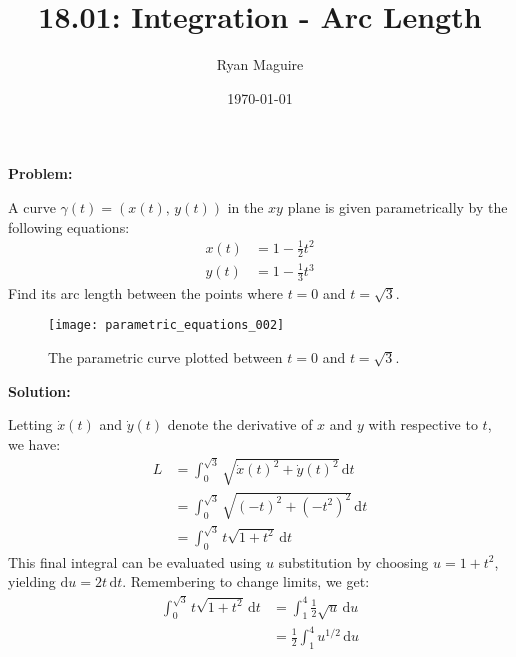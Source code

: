 \documentclass{article}
\title{18.01: Integration - Arc Length}
\author{Ryan Maguire}
\date{\today}
\newif\ifsolution
\begin{document}
    \maketitle
    \textbf{Problem:}
    \par\hfill\par
    A curve $\gamma(t)=\left(x(t),\,y(t)\right)$
    in the $xy$ plane is given parametrically by the following equations:
    \begin{subequations}
        \begin{align}
            x(t)&=1-\frac{1}{2}t^{2}\\
            y(t)&=1-\frac{1}{3}t^{3}
        \end{align}
    \end{subequations}
    Find its arc length between the points where $t=0$ and $t=\sqrt{3}$.
    \begin{figure}[H]
        \centering
        \texttt{[image: parametric\_equations\_002]}
        \caption{The parametric curve plotted between $t=0$ and $t=\sqrt{3}$.}
    \end{figure}
    \ifsolution
        \par\hfill\par
        \color{blue}
        \textbf{Solution:}
        \par\hfill\par
        Letting $\dot{x}(t)$ and $\dot{y}(t)$ denote the derivative of
        $x$ and $y$ with respective to $t$, we have:
        \begin{subequations}
            \begin{align}
                L&=\int_{0}^{\sqrt{3}}
                    \sqrt{\dot{x}(t)^{2}+\dot{y}(t)^{2}}\,\textrm{d}t\\
                &=\int_{0}^{\sqrt{3}}\sqrt{(-t)^2+(-t^2)^2}\,\textrm{d}t\\
                &=\int_{0}^{\sqrt{3}}t\sqrt{1+t^{2}}\,\textrm{d}t
            \end{align}
        \end{subequations}
        This final integral can be evaluated using $u$ substitution
        by choosing $u=1+t^{2}$, yielding $\textrm{d}u=2t\,\textrm{d}t$.
        Remembering to change limits, we get:
        \begin{subequations}
            \begin{align}
                \int_{0}^{\sqrt{3}}t\sqrt{1+t^{2}}\,\textrm{d}t
                &=\int_{1}^{4}\frac{1}{2}\sqrt{u}\,\textrm{d}u\\
                &=\frac{1}{2}\int_{1}^{4}u^{1/2}\,\textrm{d}u
            \end{align}
        \end{subequations}
\end{document}

